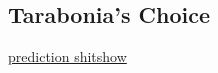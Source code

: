 \subsection{Tarabonia's Choice}

\href{https://www.warzone.com/MultiPlayer?GameID=37637020}{prediction shitshow}